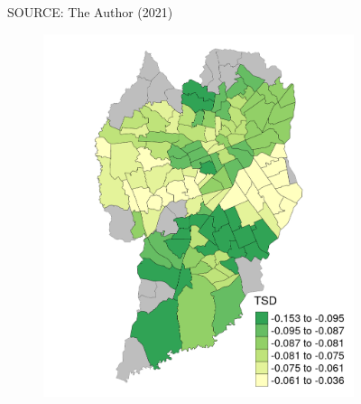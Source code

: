 \begin{figure}[!htbp]
\begin{subfigure}{0.5\textwidth}
    \end{subfigure}    
    \label{fig:gwr_par}
    \par SOURCE: The Author (2021)
\end{figure}


\begin{figure}[!htbp]
    \centering\footnotesize
    \captionsetup{font=footnotesize}
    \caption{TSD COEFFICIENT ESTIMATES}
    \begin{subfigure}{0.5\textwidth}
        \includegraphics{fig/TSD.png}
    \end{subfigure}%
    \begin{subfigure}{0.5\textwidth}

\end{subfigure}
\end{figure}
